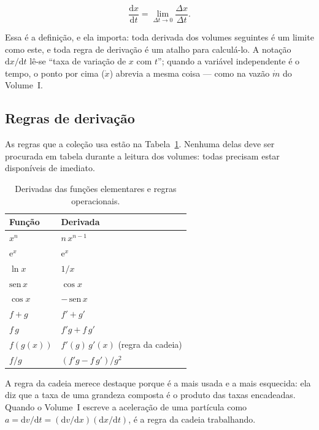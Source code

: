 \documentclass[12pt,a4paper]{article}
\numberwithin{equation}{section}
\numberwithin{table}{section}
\numberwithin{figure}{section}
\begin{document}
\begin{equation}\label{eq:v0-c6-1}
\frac{\mathrm{d}x}{\mathrm{d}t}
  = \lim_{\Delta t \to 0} \frac{\Delta x}{\Delta t}.
\end{equation}

Essa é a definição, e ela importa: toda derivada dos volumes seguintes é
um limite como este, e toda regra de derivação é um atalho para calculá-lo.
A notação $\mathrm{d}x/\mathrm{d}t$ lê-se ``taxa de variação de $x$ com
$t$''; quando a variável independente é o tempo, o ponto por cima
($\dot{x}$) abrevia a mesma coisa --- como na vazão $\dot{m}$ do
Volume~I.

\subsection{Regras de derivação}

As regras que a coleção usa estão na Tabela~\ref{tab:v0-c6-1}. Nenhuma
delas deve ser procurada em tabela durante a leitura dos volumes: todas
precisam estar disponíveis de imediato.

\begin{table}[H]
\centering
\caption[Regras de derivação usadas nesta coleção.]{%
Derivadas das funções elementares e regras operacionais.}
\label{tab:v0-c6-1}
\begin{tabularx}{\textwidth}{lX}
\toprule
\textbf{Função} & \textbf{Derivada} \\
\midrule
$x^n$ & $n\,x^{n-1}$ \\
$\mathrm{e}^{x}$ & $\mathrm{e}^{x}$ \\
$\ln x$ & $1/x$ \\
$\mathrm{sen}\,x$ & $\cos x$ \\
$\cos x$ & $-\,\mathrm{sen}\,x$ \\
\midrule
$f + g$ & $f' + g'$ \\
$f\,g$ & $f'g + f\,g'$ \\
$f(g(x))$ & $f'(g)\,g'(x)$ \quad (regra da cadeia) \\
$f/g$ & $(f'g - f\,g')/g^2$ \\
\bottomrule
\end{tabularx}
\end{table}

A regra da cadeia merece destaque porque é a mais usada e a mais
esquecida: ela diz que a taxa de uma grandeza composta é o produto das
taxas encadeadas. Quando o Volume~I escreve a aceleração de uma partícula
como $a = \mathrm{d}v/\mathrm{d}t = (\mathrm{d}v/\mathrm{d}x)(\mathrm{d}x/
\mathrm{d}t)$, é a regra da cadeia trabalhando.
\end{document}
